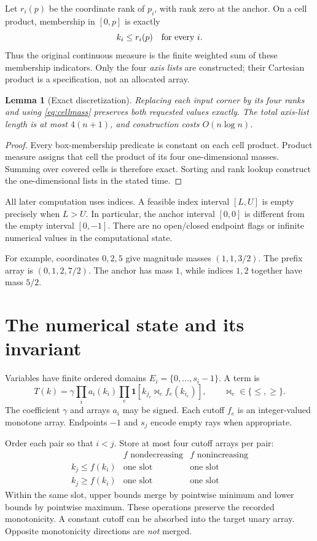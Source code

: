 \documentclass[12pt,a4paper]{article}
\newtheorem{lemma}[theorem]{Lemma}
\theoremstyle{remark}
\newcommand{\1}{\mathbf1}
\begin{document}
Let $r_i(p)$ be the coordinate rank of $p_i$, with rank zero at the anchor.
On a cell product, membership in $[0,p]$ is exactly
\[
                 k_i\le r_i(p)\quad\hbox{for every }i.
\]
Thus the original continuous measure is the finite weighted sum of these
membership indicators. Only the four \emph{axis lists} are constructed;
their Cartesian product is a specification, not an allocated array.

\begin{lemma}[Exact discretization]\label{lem:discrete}
Replacing each input corner by its four ranks and using
\eqref{eq:cellmass} preserves both requested values exactly. The total
axis-list length is at most $4(n+1)$, and construction costs $O(n\log n)$.
\end{lemma}
\begin{proof}
Every box-membership predicate is constant on each cell product. Product
measure assigns that cell the product of its four one-dimensional masses.
Summing over covered cells is therefore exact. Sorting and rank lookup
construct the one-dimensional lists in the stated time.
\end{proof}

All later computation uses indices. A feasible index interval $[L,U]$ is
empty precisely when $L>U$. In particular, the anchor interval $[0,0]$
is different from the empty interval $[0,-1]$. There are no open/closed
endpoint flags or infinite numerical values in the computational state.

For example, coordinates $0,2,5$ give magnitude masses
$(1,1,3/2)$. The prefix array is $(0,1,2,7/2)$.
The anchor has mass $1$, while indices $1,2$ together have mass $5/2$.

\section{The numerical state and its invariant}\label{sec:state}
Variables have finite ordered domains
$E_i=\{0,\ldots,s_i-1\}$. A term is
\begin{equation}
 T(k)=\gamma\prod_i a_i(k_i)
           \prod_{e}\1[k_{j_e}\mathrel{\bowtie_e}f_e(k_{i_e})],
 \qquad \bowtie_e\in\{\le,\ge\}.                 \label{eq:term}
\end{equation}
The coefficient $\gamma$ and arrays $a_i$ may be signed. Each cutoff
$f_e$ is an integer-valued monotone array. Endpoints $-1$ and $s_j$
encode empty rays when appropriate.

Order each pair so that $i<j$. Store at most four cutoff arrays per pair:
\[
 \begin{array}{c|cc}
       & f\text{ nondecreasing}&f\text{ nonincreasing}\\\hline
 k_j\le f(k_i)&\text{one slot}&\text{one slot}\\
 k_j\ge f(k_i)&\text{one slot}&\text{one slot}
 \end{array}
\]
Within the same slot, upper bounds merge by pointwise minimum and lower
bounds by pointwise maximum. These operations preserve the recorded
monotonicity. A constant cutoff can be absorbed into the target unary
array. Opposite monotonicity directions are \emph{not} merged.
\end{document}
